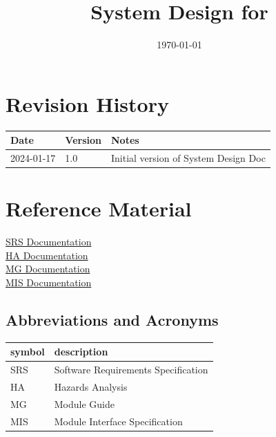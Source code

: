 \documentclass[12pt, titlepage]{article}
\begin{document}
\title{System Design for \progname{}} 
\author{\authname}
\date{\today}

\maketitle


\section{Revision History}

\begin{tabularx}{\textwidth}{p{3cm}p{2cm}X}
\toprule {\bf Date} & {\bf Version} & {\bf Notes}\\
\midrule
2024-01-17 & 1.0 & Initial version of System Design Doc\\
\bottomrule
\end{tabularx}

\newpage

\section{Reference Material}

\href{https://github.com/davimang/REACH/blob/main/docs/SRS/SRS.pdf}{SRS Documentation}\\
\href{https://github.com/davimang/REACH/blob/main/docs/HazardAnalysis/HazardAnalysis.pdf}{HA Documentation}\\
\href{https://github.com/davimang/REACH/blob/main/docs/Design/SoftArchitecture/MG.pdf}{MG Documentation}\\
\href{https://github.com/davimang/REACH/blob/design_docs/docs/Design/SoftDetailedDes/MIS.pdf}{MIS Documentation}


\subsection{Abbreviations and Acronyms}

\renewcommand{\arraystretch}{1.2}
\begin{tabular}{l l} 
  \toprule		
  \textbf{symbol} & \textbf{description}\\
  \midrule 
  SRS & Software Requirements Specification\\
  HA & Hazards Analysis\\
  MG & Module Guide\\
  MIS & Module Interface Specification\\
  \bottomrule
\end{tabular}\\
\end{document}
